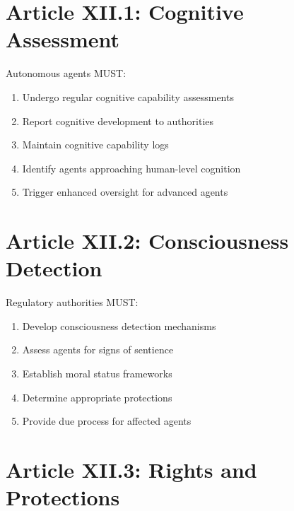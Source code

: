 \vspace{0.5cm}

\section{Article XII.1: Cognitive Assessment}

\begin{articlebox}
Autonomous agents MUST:
\begin{enumerate}
    \item Undergo regular cognitive capability assessments
    \item Report cognitive development to authorities
    \item Maintain cognitive capability logs
    \item Identify agents approaching human-level cognition
    \item Trigger enhanced oversight for advanced agents
\end{enumerate}
\end{articlebox}

\vspace{0.5cm}

\section{Article XII.2: Consciousness Detection}

\begin{articlebox}
Regulatory authorities MUST:
\begin{enumerate}
    \item Develop consciousness detection mechanisms
    \item Assess agents for signs of sentience
    \item Establish moral status frameworks
    \item Determine appropriate protections
    \item Provide due process for affected agents
\end{enumerate}
\end{articlebox}

\vspace{0.5cm}

\section{Article XII.3: Rights and Protections}

